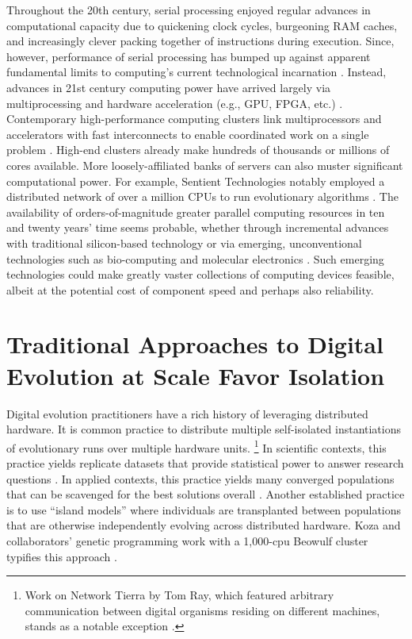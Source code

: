 Throughout the 20th century, serial processing enjoyed regular advances in computational capacity due to quickening clock cycles, burgeoning RAM caches, and increasingly clever packing together of instructions during execution.
Since, however, performance of serial processing has bumped up against apparent fundamental limits to computing’s current technological incarnation \citep{sutter2005free}.
Instead, advances in 21st century computing power have arrived largely via multiprocessing \citep[p.~55]{hennessy2011computer} and hardware acceleration (e.g., GPU, FPGA, etc.) \citep{che2008accelerating}.
Contemporary high-performance computing clusters link multiprocessors and accelerators with fast interconnects to enable coordinated work on a single problem \citep[p.~436]{hennessy2011computer}.
High-end clusters already make hundreds of thousands or millions of cores available.
More loosely-affiliated banks of servers can also muster significant computational power.
For example, Sentient Technologies notably employed a distributed network of over a million CPUs to run evolutionary algorithms \citep{miikkulainen2019evolving}.
The availability of orders-of-magnitude greater parallel computing resources in ten and twenty years’ time seems probable, whether through incremental advances with traditional silicon-based technology \citep{gropp2013programming,dongarra2014applied} or via emerging, unconventional technologies such as bio-computing \citep{benenson2009biocomputers} and molecular electronics \citep{xiang2016molecular}.
Such emerging technologies could make greatly vaster collections of computing devices feasible, albeit at the potential cost of component speed \citep{bonnet2013amplifying, ellenbogen2000architectures} and perhaps also reliability.

\section{Traditional Approaches to Digital Evolution at Scale Favor Isolation}

Digital evolution practitioners have a rich history of leveraging distributed hardware.
It is common practice to distribute multiple self-isolated instantiations of evolutionary runs over multiple hardware units.
\footnote{
Work on Network Tierra by Tom Ray, which featured arbitrary communication between digital organisms residing on different machines, stands as a notable exception \citep{ray1995proposal}.
}
In scientific contexts, this practice yields replicate datasets that provide statistical power to answer research questions \citep{dolson2017spatial}.
In applied contexts, this practice yields many converged populations that can be scavenged for the best solutions overall \citep{hornby2006automated}.
Another established practice is to use ``island models'' where individuals are transplanted between populations that are otherwise independently evolving across distributed hardware.
Koza and collaborators’ genetic programming work with a 1,000-cpu Beowulf cluster typifies this approach \citep{bennett1999building}.

